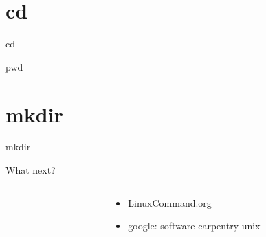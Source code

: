 \documentclass[xcolor=table]{beamer}
\begin{document}
\section{cd}
\begin{frame}
\begin{center}
\Huge cd
\end{center}
\end{frame}
\begin{frame}
\begin{center}
\Huge pwd
\end{center}
\end{frame}
\section{mkdir}
\begin{frame}
\begin{center}
\Huge mkdir
\end{center}
\end{frame}
\begin{frame}{What next?}
\Large
\begin{columns}
\begin{column}{.2\textwidth}
\vspace{.1in}
\end{column}
\begin{column}{.8\textwidth}
\begin{center}
\begin{itemize}
\item LinuxCommand.org\\
\item google: software carpentry unix\\
\end{itemize}
\end{center}
\end{column}
\end{columns}

\end{frame}

\end{document}
